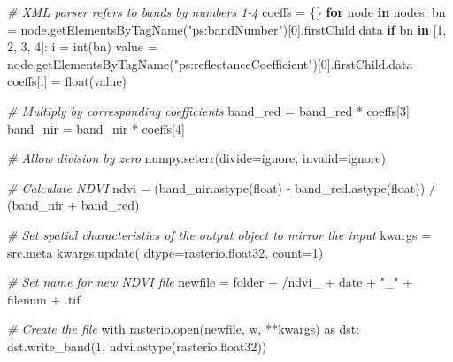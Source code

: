 \documentclass[12pt,twoside]{reedthesis}
\newenvironment{Shaded}{\begin{snugshade}}{\end{snugshade}}
\newcommand{\AttributeTok}[1]{\textcolor[rgb]{0.77,0.63,0.00}{#1}}
\newcommand{\CommentTok}[1]{\textcolor[rgb]{0.56,0.35,0.01}{\textit{#1}}}
\newcommand{\ControlFlowTok}[1]{\textcolor[rgb]{0.13,0.29,0.53}{\textbf{#1}}}
\newcommand{\DecValTok}[1]{\textcolor[rgb]{0.00,0.00,0.81}{#1}}
\newcommand{\FunctionTok}[1]{\textcolor[rgb]{0.00,0.00,0.00}{#1}}
\newcommand{\NormalTok}[1]{#1}
\newcommand{\OtherTok}[1]{\textcolor[rgb]{0.56,0.35,0.01}{#1}}
\newcommand{\SpecialCharTok}[1]{\textcolor[rgb]{0.00,0.00,0.00}{#1}}
\newcommand{\StringTok}[1]{\textcolor[rgb]{0.31,0.60,0.02}{#1}}
\begin{document}
\begin{Shaded}
\begin{Highlighting}[]
    \CommentTok{\# XML parser refers to bands by numbers 1{-}4}
\NormalTok{    coeffs }\OtherTok{=}\NormalTok{ \{\}}
    \ControlFlowTok{for}\NormalTok{ node }\ControlFlowTok{in}\NormalTok{ nodes}\SpecialCharTok{:}
\NormalTok{        bn }\OtherTok{=} \FunctionTok{node.getElementsByTagName}\NormalTok{(}\StringTok{"ps:bandNumber"}\NormalTok{)[}\DecValTok{0}\NormalTok{].firstChild.data}
        \ControlFlowTok{if}\NormalTok{ bn }\ControlFlowTok{in}\NormalTok{ [}\StringTok{\textquotesingle{}1\textquotesingle{}}\NormalTok{, }\StringTok{\textquotesingle{}2\textquotesingle{}}\NormalTok{, }\StringTok{\textquotesingle{}3\textquotesingle{}}\NormalTok{, }\StringTok{\textquotesingle{}4\textquotesingle{}}\NormalTok{]}\SpecialCharTok{:}
\NormalTok{            i }\OtherTok{=} \FunctionTok{int}\NormalTok{(bn)}
\NormalTok{            value }\OtherTok{=} \FunctionTok{node.getElementsByTagName}\NormalTok{(}\StringTok{"ps:reflectanceCoefficient"}\NormalTok{)[}\DecValTok{0}\NormalTok{].firstChild.data}
\NormalTok{            coeffs[i] }\OtherTok{=} \FunctionTok{float}\NormalTok{(value)}

    \CommentTok{\# Multiply by corresponding coefficients}
\NormalTok{    band\_red }\OtherTok{=}\NormalTok{ band\_red }\SpecialCharTok{*}\NormalTok{ coeffs[}\DecValTok{3}\NormalTok{]}
\NormalTok{    band\_nir }\OtherTok{=}\NormalTok{ band\_nir }\SpecialCharTok{*}\NormalTok{ coeffs[}\DecValTok{4}\NormalTok{]}

    \CommentTok{\# Allow division by zero}
    \FunctionTok{numpy.seterr}\NormalTok{(}\AttributeTok{divide=}\StringTok{\textquotesingle{}ignore\textquotesingle{}}\NormalTok{, }\AttributeTok{invalid=}\StringTok{\textquotesingle{}ignore\textquotesingle{}}\NormalTok{)}

    \CommentTok{\# Calculate NDVI}
\NormalTok{    ndvi }\OtherTok{=}\NormalTok{ (}\FunctionTok{band\_nir.astype}\NormalTok{(float) }\SpecialCharTok{{-}} \FunctionTok{band\_red.astype}\NormalTok{(float)) }\SpecialCharTok{/}\NormalTok{ (band\_nir }\SpecialCharTok{+}\NormalTok{ band\_red)}

    \CommentTok{\# Set spatial characteristics of the output object to mirror the input}
\NormalTok{    kwargs }\OtherTok{=}\NormalTok{ src.meta}
    \FunctionTok{kwargs.update}\NormalTok{(}
        \AttributeTok{dtype=}\NormalTok{rasterio.float32,}
        \AttributeTok{count=}\DecValTok{1}\NormalTok{)}
    
    \CommentTok{\# Set name for new NDVI file}
\NormalTok{    newfile }\OtherTok{=}\NormalTok{ folder }\SpecialCharTok{+} \StringTok{\textquotesingle{}/ndvi\_\textquotesingle{}} \SpecialCharTok{+}\NormalTok{ date }\SpecialCharTok{+} \StringTok{"\_"} \SpecialCharTok{+}\NormalTok{ filenum }\SpecialCharTok{+} \StringTok{\textquotesingle{}.tif\textquotesingle{}}

    \CommentTok{\# Create the file}
\NormalTok{    with }\FunctionTok{rasterio.open}\NormalTok{(newfile, }\StringTok{\textquotesingle{}w\textquotesingle{}}\NormalTok{, }\SpecialCharTok{**}\NormalTok{kwargs) as dst}\SpecialCharTok{:}
        \FunctionTok{dst.write\_band}\NormalTok{(}\DecValTok{1}\NormalTok{, }\FunctionTok{ndvi.astype}\NormalTok{(rasterio.float32))}
\end{Highlighting}
\end{Shaded}
\end{document}

